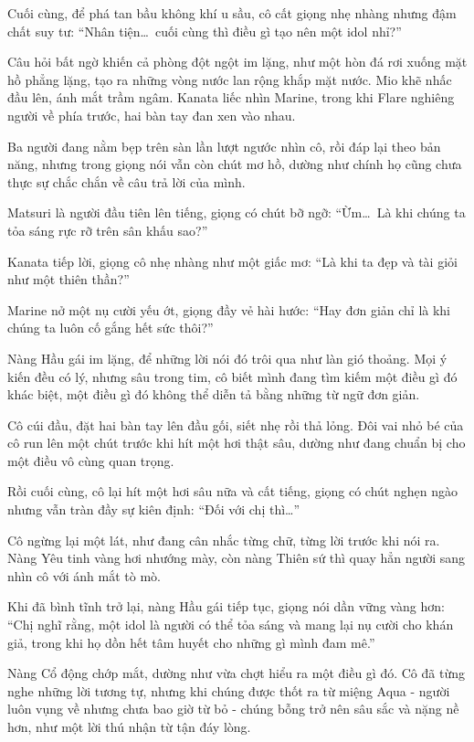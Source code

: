 \documentclass[../main.tex]{subfiles}
\begin{document}
Cuối cùng, để phá tan bầu không khí u sầu, cô cất giọng nhẹ nhàng nhưng đậm chất suy tư: ``Nhân tiện\dots\ cuối cùng thì điều gì tạo nên một idol nhỉ?''

Câu hỏi bất ngờ khiến cả phòng đột ngột im lặng, như một hòn đá rơi xuống mặt hồ phẳng lặng, tạo ra những vòng nước lan rộng khắp mặt nước. Mio khẽ nhấc đầu lên, ánh mắt trầm ngâm. Kanata liếc nhìn Marine, trong khi Flare nghiêng người về phía trước, hai bàn tay đan xen vào nhau.

Ba người đang nằm bẹp trên sàn lần lượt ngước nhìn cô, rồi đáp lại theo bản năng, nhưng trong giọng nói vẫn còn chút mơ hồ, dường như chính họ cũng chưa thực sự chắc chắn về câu trả lời của mình.

Matsuri là người đầu tiên lên tiếng, giọng có chút bỡ ngỡ: ``Ừm\dots\ Là khi chúng ta tỏa sáng rực rỡ trên sân khấu sao?''

Kanata tiếp lời, giọng cô nhẹ nhàng như một giấc mơ: ``Là khi ta đẹp và tài giỏi như một thiên thần?''

Marine nở một nụ cười yếu ớt, giọng đầy vẻ hài hước: ``Hay đơn giản chỉ là khi chúng ta luôn cố gắng hết sức thôi?''

Nàng Hầu gái im lặng, để những lời nói đó trôi qua như làn gió thoảng. Mọi ý kiến đều có lý, nhưng sâu trong tim, cô biết mình đang tìm kiếm một điều gì đó khác biệt, một điều gì đó không thể diễn tả bằng những từ ngữ đơn giản.

Cô cúi đầu, đặt hai bàn tay lên đầu gối, siết nhẹ rồi thả lỏng. Đôi vai nhỏ bé của cô run lên một chút trước khi hít một hơi thật sâu, dường như đang chuẩn bị cho một điều vô cùng quan trọng.

Rồi cuối cùng, cô lại hít một hơi sâu nữa và cất tiếng, giọng có chút nghẹn ngào nhưng vẫn tràn đầy sự kiên định: ``Đối với chị thì\dots''


Cô ngừng lại một lát, như đang cân nhắc từng chữ, từng lời trước khi nói ra. Nàng Yêu tinh vàng hơi nhướng mày, còn nàng Thiên sứ thì quay hẳn người sang nhìn cô với ánh mắt tò mò.

Khi đã bình tĩnh trở lại, nàng Hầu gái tiếp tục, giọng nói dần vững vàng hơn: ``Chị nghĩ rằng, một idol là người có thể tỏa sáng và mang lại nụ cười cho khán giả, trong khi họ dồn hết tâm huyết cho những gì mình đam mê.''

Nàng Cổ động chớp mắt, dường như vừa chợt hiểu ra một điều gì đó. Cô đã từng nghe những lời tương tự, nhưng khi chúng được thốt ra từ miệng Aqua - người luôn vụng về nhưng chưa bao giờ từ bỏ - chúng bỗng trở nên sâu sắc và nặng nề hơn, như một lời thú nhận từ tận đáy lòng.
\end{document}
